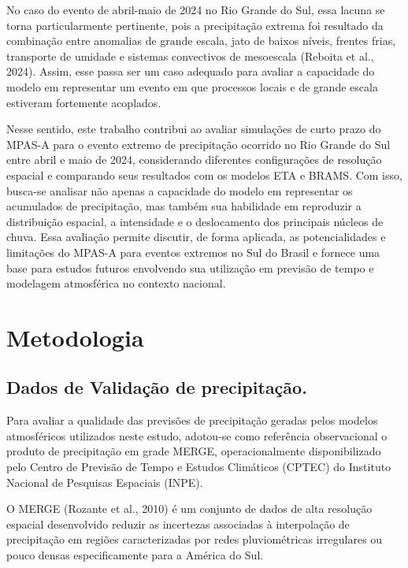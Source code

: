 \documentclass[12pt,a4paper,oneside]{book}
\begin{document}
No caso do evento de abril-maio de 2024 no Rio Grande do Sul, essa lacuna se torna particularmente pertinente, pois a precipitação extrema foi resultado da combinação entre anomalias de grande escala, jato de baixos níveis, frentes frias, transporte de umidade e sistemas convectivos de mesoescala (Reboita et al., 2024). Assim, esse passa ser um caso adequado para avaliar a capacidade do modelo em representar um evento em que processos locais e de grande escala estiveram fortemente acoplados.

Nesse sentido, este trabalho contribui ao avaliar simulações de curto prazo do MPAS-A para o evento extremo de precipitação ocorrido no Rio Grande do Sul entre abril e maio de 2024, considerando diferentes configurações de resolução espacial e comparando seus resultados com os modelos ETA e BRAMS. Com isso, busca-se analisar não apenas a capacidade do modelo em representar os acumulados de precipitação, mas também sua habilidade em reproduzir a distribuição espacial, a intensidade e o deslocamento dos principais núcleos de chuva. Essa avaliação permite discutir, de forma aplicada, as potencialidades e limitações do MPAS-A para eventos extremos no Sul do Brasil e fornece uma base para estudos futuros envolvendo sua utilização em previsão de tempo e modelagem atmosférica no contexto nacional.

\chapter{Metodologia}

\section{Dados de Validação de precipitação.}

Para avaliar a qualidade das previsões de precipitação geradas pelos modelos atmosféricos utilizados neste estudo, adotou-se como referência observacional o produto de precipitação em grade MERGE, operacionalmente disponibilizado pelo Centro de Previsão de Tempo e Estudos Climáticos (CPTEC) do Instituto Nacional de Pesquisas Espaciais (INPE).

O MERGE (Rozante et al., 2010) é um conjunto de dados de alta resolução espacial desenvolvido reduzir as incertezas associadas à interpolação de precipitação em regiões caracterizadas por redes pluviométricas irregulares ou pouco densas especificamente para a América do Sul.
\end{document}
